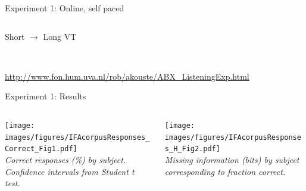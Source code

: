 \documentclass[xcolor={dvipsnames}]{beamer}
\begin{document}
\begin{frame}{Experiment 1: Online, self paced}
\begin{columns}
\centering
    \begin{column}{0.24\textwidth}
    Short $\rightarrow$ Long VT\\
    \ 
    \vskip 0.5cm
    \end{column}
    \begin{column}{0.24\textwidth}
\centering
{} \\
\href{http://www.fon.hum.uva.nl/rob/akouste/Stimuli/F20N2PS37A_fm_500-120-4.2.wav}{\Large{\textbf{\only<1>{A}\only<2>{\color{red}{A}}}}}
    \end{column}
    \begin{column}{0.24\textwidth}
\centering
{} \\
\href{http://www.fon.hum.uva.nl/rob/akouste/Stimuli/F40L2PS36A_fm_575-175-4.2.wav}{\Large{\textbf{\only<1>{X}\only<2>{\color{blue}{X}}}}}
    \end{column}
    \begin{column}{0.25\textwidth}
\centering
{} \\
\href{http://www.fon.hum.uva.nl/rob/akouste/Stimuli/F40L2PS37A_fm_500-120-4.2.wav}{\Large{\textbf{\only<1>{B}\only<2>{\color{blue}{B}}}}}
    \end{column}
\end{columns}
\vskip 1.5cm

\hfill \scriptsize{\url{ http://www.fon.hum.uva.nl/rob/akouste/ABX_ListeningExp.html}}

\end{frame}

\begin{frame}{Experiment 1: Results}
    \begin{columns}
        \centering
        \begin{column}{0.48\textwidth}
        \texttt{[image: images/figures/IFAcorpusResponses\_Correct\_Fig1.pdf]}\\
        \scriptsize{\textit{Correct responses (\%) by subject.
        Confidence intervals from Student t test.}}
        \end{column}
        \begin{column}{0.48\textwidth}
        \texttt{[image: images/figures/IFAcorpusResponses\_H\_Fig2.pdf]}\\
        \scriptsize{\textit{Missing information (bits) by subject corresponding to fraction correct.}}
        \end{column}
    \end{columns}

\end{frame}
\end{document}

